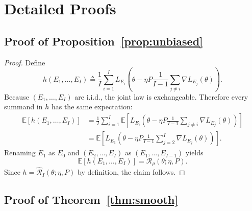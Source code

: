 \documentclass{article}
\newcommand{\EE}{\mathbb{E}}
\newcommand{\iid}{i.i.d.}
\begin{document}
\section{Detailed Proofs}

\subsection{Proof of Proposition~\ref{prop:unbiased}}

\begin{proof}
Define
\begin{equation}
    h(E_1,\dots,E_I)
    \triangleq
    \frac{1}{I}\sum_{i=1}^{I}
    L_{E_i}\left(
    \theta - \eta P \frac{1}{I-1}\sum_{j\neq i}\nabla L_{E_j}(\theta)
    \right).
\end{equation}
Because $(E_1,\dots,E_I)$ are \iid{}, the joint law is exchangeable. Therefore every summand in $h$ has the same expectation:
\begin{align}
    \EE[h(E_1,\dots,E_I)]
    &=
    \frac{1}{I}\sum_{i=1}^{I}
    \EE\left[
    L_{E_i}\left(
    \theta - \eta P \frac{1}{I-1}\sum_{j\neq i}\nabla L_{E_j}(\theta)
    \right)
    \right] \\
    &=
    \EE\left[
    L_{E_1}\left(
    \theta - \eta P \frac{1}{I-1}\sum_{j=2}^{I}\nabla L_{E_j}(\theta)
    \right)
    \right].
\end{align}
Renaming $E_1$ as $E_0$ and $(E_2,\dots,E_I)$ as $(E_1,\dots,E_{I-1})$ yields
\begin{equation}
    \EE[h(E_1,\dots,E_I)] = \mathcal{R}_{\rho}(\theta;\eta,P).
\end{equation}
Since $h = \widehat{\mathcal{R}}_I(\theta;\eta,P)$ by definition, the claim follows.
\end{proof}

\subsection{Proof of Theorem~\ref{thm:smooth}}
\end{document}
